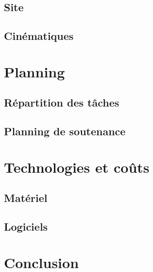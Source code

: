 \documentclass[10pt]{article} %
\begin{document}
\subsection{Site}



\subsection{Cinématiques}



\section{Planning}



\subsection{Répartition des tâches}



\subsection{Planning de soutenance}



\section{Technologies et coûts}



\subsection{Matériel}



\subsection{Logiciels}



\section{Conclusion}
\end{document}
